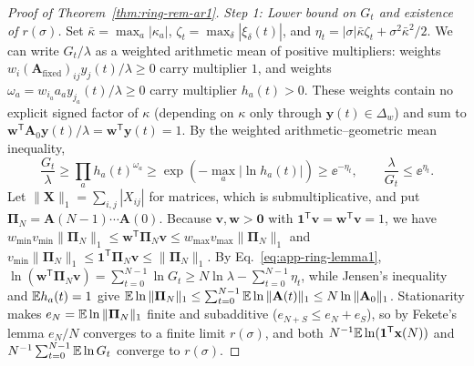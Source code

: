 \begin{proof}[Proof of Theorem~{\upshape\ref{thm:ring-rem-ar1}}]
\emph{Step 1: Lower bound on $G_t$ and existence of $r(\sigma)$.} Set $\bar{\kappa} = \max_a |\kappa_a|$, $\zeta_t = \max_\delta |\xi_\delta(t)|$, and $\eta_t = |\sigma|\bar{\kappa}\zeta_t + \sigma^2\bar{\kappa}^2/2$. We can write $G_t/\lambda$ as a weighted arithmetic mean of positive multipliers: weights $w_i (\mathbf{A}_{\mathrm{fixed}})_{ij} y_j(t)/\lambda \ge 0$ carry multiplier $1$, and weights $\omega_a = w_{i_a} a_a y_{j_a}(t)/\lambda \ge 0$ carry multiplier $h_a(t) > 0$. These weights contain no explicit signed factor of $\kappa$ (depending on $\kappa$ only through $\mathbf{y}(t) \in \Delta_w$) and sum to $\mathbf{w}^{\mathsf{T}}\mathbf{A}_0\mathbf{y}(t)/\lambda = \mathbf{w}^{\mathsf{T}}\mathbf{y}(t) = 1$. By the weighted arithmetic--geometric mean inequality,
\begin{equation}
\frac{G_t}{\lambda} \ge \prod_a h_a(t)^{\omega_a} \ge \exp\!\left(-\max_a |\ln h_a(t)|\right) \ge \ee^{-\eta_t}, \qquad \frac{\lambda}{G_t} \le \ee^{\eta_t}.
\label{eq:app-ring-lemma1}
\end{equation}
Let $\|\mathbf{X}\|_1 = \sum_{i,j} |X_{ij}|$ for matrices, which is submultiplicative, and put $\boldsymbol{\Pi}_N = \mathbf{A}(N - 1)\cdots\mathbf{A}(0)$. Because $\mathbf{v}, \mathbf{w} > \mathbf{0}$ with $\mathbf{1}^{\mathsf{T}}\mathbf{v} = \mathbf{w}^{\mathsf{T}}\mathbf{v} = 1$, we have $w_{\min} v_{\min} \|\boldsymbol{\Pi}_N\|_1 \le \mathbf{w}^{\mathsf{T}}\boldsymbol{\Pi}_N\mathbf{v} \le w_{\max} v_{\max} \|\boldsymbol{\Pi}_N\|_1$ and $v_{\min} \|\boldsymbol{\Pi}_N\|_1 \le \mathbf{1}^{\mathsf{T}}\boldsymbol{\Pi}_N\mathbf{v} \le \|\boldsymbol{\Pi}_N\|_1$. By Eq.~\eqref{eq:app-ring-lemma1}, $\ln(\mathbf{w}^{\mathsf{T}}\boldsymbol{\Pi}_N\mathbf{v}) = \sum_{t=0}^{N-1} \ln G_t \ge N\ln\lambda - \sum_{t=0}^{N-1} \eta_t$, while Jensen's inequality and $\mathbb{E} h_a(t) = 1$ give $\mathbb{E}\ln\|\boldsymbol{\Pi}_N\|_1 \le \sum_{t=0}^{N-1} \mathbb{E}\ln\|\mathbf{A}(t)\|_1 \le N\ln\|\mathbf{A}_0\|_1$. Stationarity makes $e_N = \mathbb{E}\ln\|\boldsymbol{\Pi}_N\|_1$ finite and subadditive ($e_{N+S} \le e_N + e_S$), so by Fekete's lemma $e_N/N$ converges to a finite limit $r(\sigma)$, and both $N^{-1}\mathbb{E}\ln(\mathbf{1}^{\mathsf{T}}\mathbf{x}(N))$ and $N^{-1}\sum_{t=0}^{N-1} \mathbb{E}\ln G_t$ converge to $r(\sigma)$.


\end{proof}
